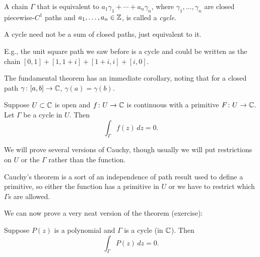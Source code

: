 \documentclass[10pt,aspectratio=169]{beamer}
\begin{document}
\begin{frame}

\begin{definition}
A chain $\Gamma$ that is equivalent to
$a_1 \gamma_1 + \cdots + a_n \gamma_n$, where $\gamma_1, \ldots, \gamma_n$
are closed piecewise-$C^1$ paths
and $a_1,\ldots,a_n \in {\mathbb{Z}}$,
is called a \emph{cycle}.
\end{definition}

\pause

A cycle need not be a sum of closed paths, just equivalent to it.
\pause

E.g., the unit square path we saw before is a cycle and could be written
as the chain
$[0,1] + [1,1+i]+[1+i,i]+[i,0]$.

\pause
\medskip

The fundamental theorem has an immediate corollary, noting that
for a closed path $\gamma \colon[a,b] \to {\mathbb{C}}$, $\gamma(a)=\gamma(b)$.

\pause

\begin{corollary}
Suppose $U \subset {\mathbb{C}}$ is open and $f \colon U \to {\mathbb{C}}$
is continuous with a primitive
$F \colon U \to {\mathbb{C}}$.
Let $\Gamma$ be
a cycle
in $U$.
Then
\begin{equation*}
\int_\Gamma f(z) \, dz = 0 .
\end{equation*}
\end{corollary}

\end{frame}

\begin{frame}
We will prove several versions of Cauchy, though usually we will put
restrictions on $U$ or the $\Gamma$ rather than the function.

\medskip
\pause

Cauchy's theorem is a sort of an independence of path result
used to define a primitive,
so either the function has a primitive in $U$
or we have to restrict which $\Gamma$s are allowed.

\pause
\medskip

We can now prove a very neat version of the theorem (exercise):

\begin{corollary}
Suppose $P(z)$ is a polynomial and $\Gamma$ is
a cycle (in ${\mathbb{C}}$).
Then
\begin{equation*}
\int_\Gamma P(z) \, dz = 0 .
\end{equation*}
\end{corollary}
\end{frame}
\end{document}
